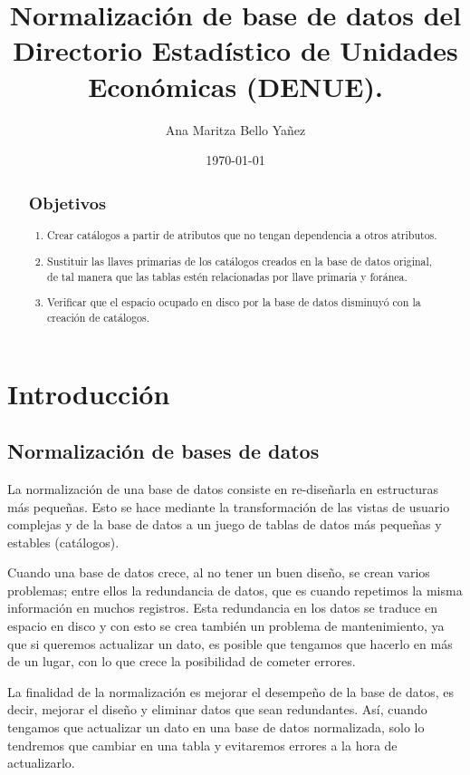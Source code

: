 \documentclass{article}
\title{Normalización de base de datos del Directorio Estadístico de Unidades Económicas (DENUE).}
\author{
    Ana Maritza Bello Yañez
}
\date{\today}
\begin{document}
\maketitle


\begin{abstract}
    \subsection{Objetivos}
    \begin{enumerate}
        \item Crear catálogos a partir de atributos que no tengan dependencia a
        otros atributos.
        \item Sustituir las llaves primarias de los catálogos creados en la base
        de datos original, de tal manera que las tablas estén relacionadas por
        llave primaria y foránea.
        \item Verificar que el espacio ocupado en disco por la base de datos
        disminuyó con la creación de catálogos.
    \end{enumerate}
\end{abstract}

\section{Introducción}

\subsection{Normalización de bases de datos}

La normalización de una base de datos consiste en re-diseñarla en estructuras
más pequeñas. Esto se hace mediante la transformación de las vistas de usuario
complejas y de la base de datos a un juego de tablas de datos más pequeñas y
estables (catálogos).

Cuando una base de datos crece, al no tener un buen diseño, se crean varios
problemas; entre ellos la redundancia de datos, que es cuando repetimos la misma
información en muchos registros. Esta redundancia en los datos se traduce en
espacio en disco y con esto se crea también un problema de mantenimiento, ya que
si queremos actualizar un dato, es posible que tengamos que hacerlo en más de un
lugar, con lo que crece la posibilidad de cometer errores.

La finalidad de la normalización es mejorar el desempeño de la base de datos, es
decir, mejorar el diseño y eliminar datos que sean redundantes. Así, cuando
tengamos que actualizar un dato en una base de datos normalizada, solo lo
tendremos que cambiar en una tabla y evitaremos errores a la hora de
actualizarlo.
\end{document}
